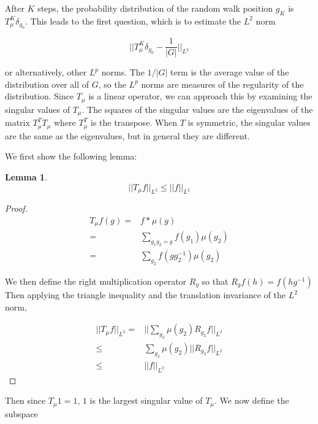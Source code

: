 \documentclass[12pt]{amsart}
\newtheorem{lemma}[theorem]{Lemma}
\begin{document}
After $K$ steps, the probability distribution of the random walk position $g_K$ is $T_\mu^K \delta_{g_0}$. This leads to the first question, which is to estimate the $L^2$ norm 

\begin{equation}
|| T_\mu^K \delta_{g_0} - \frac{1}{|G|} ||_{L^2}
\end{equation}

or alternatively, other $L^p$ norms. The $1/|G|$ term is the average value of the distribution over all of $G$, so the $L^p$ norms are measures of the regularity of the distribution. Since $T_\mu$ is a linear operator, we can approach this by examining the singular values of $T_\mu$. The squares of the singular values are the eigenvalues of the matrix $T_\mu^T T_\mu$ where $T_\mu^T$ is the transpose. When $T$ is symmetric, the singular values are the same as the eigenvalues, but in general they are different. 

We first show the following lemma:

\begin{lemma}
\begin{equation}
||T_\mu f||_{L^2} \leq ||f||_{L^2}
\end{equation}

\end{lemma}
\begin{proof}
    \begin{align}
        T_\mu f(g) = & f * \mu(g) \\
        =& \sum_{g_1g_2= g} f(g_1)\mu(g_2)       \\
         =& \sum_{g_2} f(g g_2^{-1})\mu(g_2)
    \end{align}

    We then define the right multiplication operator $R_g$ so that $R_g f(h) = f(hg^{-1})$
Then applying the triangle inequality and the translation invariance of the $L^2$ norm,

\begin{align}
    || T_\mu f||_{L^2} = &|| \sum_{g_2} \mu(g_2) R_{g_2} f ||_{L^2}\\
    \leq & \sum_{g_2} \mu(g_2) ||   R_{g_2} f ||_{L^2}\\
    \leq & ||f||_{L^2}
\end{align}
\end{proof}

Then since $T_\mu 1 = 1$, $1$ is the largest singular value of $T_\mu$. We now define the subspace 
\end{document}
